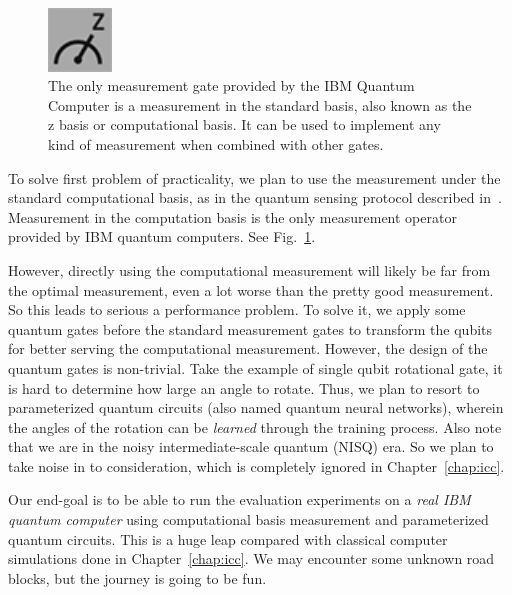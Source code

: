 \begin{figure}[ht]
    \centering
    \includegraphics[width=0.15\textwidth]{figures/measurement-gate.png}
    \caption{The only measurement gate provided by the IBM Quantum Computer is a measurement in the standard basis, 
             also known as the z basis or computational basis. It can be used to implement any kind of measurement
             when combined with other gates.}
    \label{fig:measurement}
\end{figure}

To solve first problem of practicality, we plan to use the measurement under the standard computational basis, 
as in the quantum sensing protocol described in~\cite{RevModPhys.quantumsensing}.
Measurement in the computation basis is the only measurement operator provided by IBM quantum computers. See Fig.~\ref{fig:measurement}.

However, directly using the computational measurement will likely be far from the optimal measurement, even a lot worse than the pretty good measurement.
So this leads to serious a performance problem.
To solve it, we apply some quantum gates before the standard measurement gates to transform the qubits for better serving the computational measurement.
However, the design of the quantum gates is non-trivial. Take the example of single qubit rotational gate, it is hard to determine how large an angle to rotate.
Thus, we plan to resort to parameterized quantum circuits (also named quantum neural networks), wherein the angles of the rotation can be \textit{learned} through the training process.
Also note that we are in the noisy intermediate-scale quantum (NISQ) era. So we plan to take noise in to consideration, which is completely ignored in Chapter~\ref{chap:icc}.

Our end-goal is to be able to run the evaluation experiments on a \textit{real IBM quantum computer} using computational basis measurement and parameterized quantum circuits.
This is a huge leap compared with classical computer simulations done in Chapter~\ref{chap:icc}. 
We may encounter some unknown road blocks, but the journey is going to be fun.

